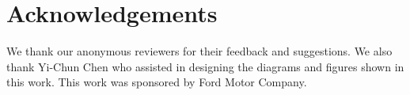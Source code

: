 \documentclass[11pt]{article}
\begin{document}
\section*{Acknowledgements}
We thank our anonymous reviewers for their feedback and suggestions. We also thank Yi-Chun Chen who assisted in designing the diagrams and figures shown in this work. This work was sponsored by Ford Motor Company.




































































\end{document}
